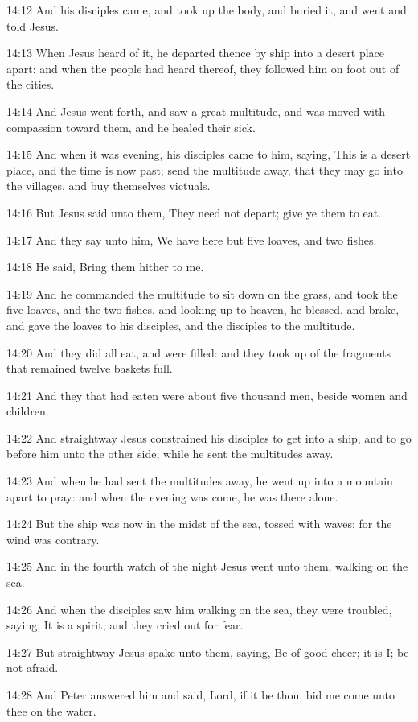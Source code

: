 14:12 And his disciples came, and took up the body, and buried it, and went and told Jesus.

14:13 When Jesus heard of it, he departed thence by ship into a desert place apart: and when the people had heard thereof, they followed him on foot out of the cities.

14:14 And Jesus went forth, and saw a great multitude, and was moved with compassion toward them, and he healed their sick.

14:15 And when it was evening, his disciples came to him, saying, This is a desert place, and the time is now past; send the multitude away, that they may go into the villages, and buy themselves victuals.

14:16 But Jesus said unto them, They need not depart; give ye them to eat.

14:17 And they say unto him, We have here but five loaves, and two fishes.

14:18 He said, Bring them hither to me.

14:19 And he commanded the multitude to sit down on the grass, and took the five loaves, and the two fishes, and looking up to heaven, he blessed, and brake, and gave the loaves to his disciples, and the disciples to the multitude.

14:20 And they did all eat, and were filled: and they took up of the fragments that remained twelve baskets full.

14:21 And they that had eaten were about five thousand men, beside women and children.

14:22 And straightway Jesus constrained his disciples to get into a ship, and to go before him unto the other side, while he sent the multitudes away.

14:23 And when he had sent the multitudes away, he went up into a mountain apart to pray: and when the evening was come, he was there alone.

14:24 But the ship was now in the midst of the sea, tossed with waves: for the wind was contrary.

14:25 And in the fourth watch of the night Jesus went unto them, walking on the sea.

14:26 And when the disciples saw him walking on the sea, they were troubled, saying, It is a spirit; and they cried out for fear.

14:27 But straightway Jesus spake unto them, saying, Be of good cheer; it is I; be not afraid.

14:28 And Peter answered him and said, Lord, if it be thou, bid me come unto thee on the water.

